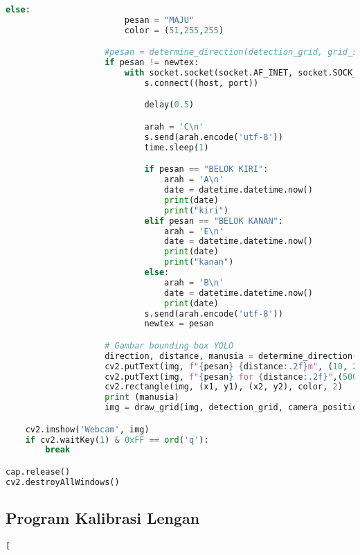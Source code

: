 \begin{lstlisting}[language=Python]
                    else:
                        pesan = "MAJU"
                        color = (51,255,255)

                    #pesan = determine_direction(detection_grid, grid_size=10)    
                    if pesan != newtex:
                        with socket.socket(socket.AF_INET, socket.SOCK_STREAM) as s:
                            s.connect((host, port))

                            delay(0.5)  

                            arah = 'C\n'
                            s.send(arah.encode('utf-8'))
                            time.sleep(1)

                            if pesan == "BELOK KIRI":
                                arah = 'A\n'
                                date = datetime.datetime.now()
                                print(date)
                                print("kiri")
                            elif pesan == "BELOK KANAN":
                                arah = 'E\n'
                                date = datetime.datetime.now()
                                print(date)
                                print("kanan")
                            else:
                                arah = 'B\n'
                                date = datetime.datetime.now()
                                print(date)
                            s.send(arah.encode('utf-8'))
                            newtex = pesan

                    # Gambar bounding box YOLO
                    direction, distance, manusia = determine_direction(detection_grid)
                    cv2.putText(img, f"{pesan} {distance:.2f}m", (10, 270), cv2.FONT_HERSHEY_SIMPLEX, 0.6, (255, 255, 255), 2)
                    cv2.putText(img, f"{pesan} for {distance:.2f}",(500,400 ), cv2.FONT_HERSHEY_SIMPLEX, 1.5, (0, 255, 255), 2 )
                    cv2.rectangle(img, (x1, y1), (x2, y2), color, 2)
                    print (manusia)
                    img = draw_grid(img, detection_grid, camera_position)

    cv2.imshow('Webcam', img)
    if cv2.waitKey(1) & 0xFF == ord('q'):
        break

cap.release()
cv2.destroyAllWindows()
\end{lstlisting}

\subsection*{Program Kalibrasi Lengan}

\begin{lstlisting}[


\end{lstlisting}